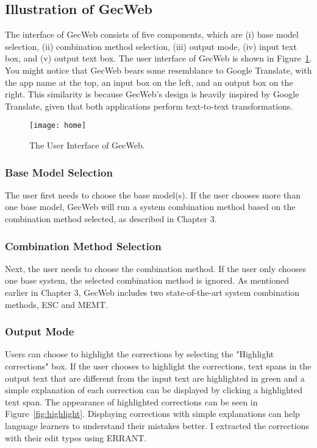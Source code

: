 \subsection{Illustration of GecWeb}

The interface of GecWeb consists of five components, which are (i) base model selection, (ii) combination method selection, (iii) output mode, (iv) input text box, and (v) output text box.
The user interface of GecWeb is shown in Figure~\ref{fig:home}.
You might notice that GecWeb bears some resemblance to Google Translate, with the app name at the top, an input box on the left, and an output box on the right.
This similarity is because GecWeb's design is heavily inspired by Google Translate, given that both applications perform text-to-text transformations.

\begin{figure}[htbp]
  \begin{center}
    \texttt{[image: home]}
  \end{center}
  \caption{The User Interface of GecWeb.}\label{fig:home}
\end{figure}

\subsubsection{Base Model Selection}

The user first needs to choose the base model(s).
If the user chooses more than one base model, GecWeb will run a system combination method based on the combination method selected, as described in Chapter 3.

\subsubsection{Combination Method Selection}

Next, the user needs to choose the combination method.
If the user only chooses one base system, the selected combination method is ignored.
As mentioned earlier in Chapter 3, GecWeb includes two state-of-the-art system combination methods, ESC and MEMT.

\subsubsection{Output Mode}

Users can choose to highlight the corrections by selecting the "Highlight corrections" box.
If the user chooses to highlight the corrections, text spans in the output text that are different from the input text are highlighted in green and a simple explanation of each correction can be displayed by clicking a highlighted text span.
The appearance of highlighted corrections can be seen in Figure~\ref{fig:highlight}.
Displaying corrections with simple explanations can help language learners to understand their mistakes better.
I extracted the corrections with their edit types using ERRANT.

